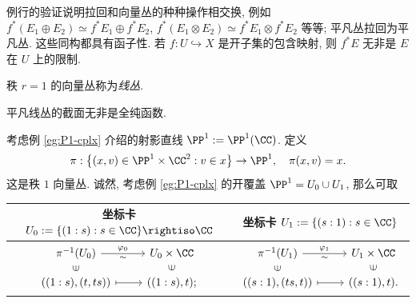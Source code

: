 例行的验证说明拉回和向量丛的种种操作相交换, 例如 $f^*(E_1 \oplus E_2) \simeq f^* E_1 \oplus f^* E_2$, $f^*(E_1 \otimes E_2) \simeq f^* E_1 \otimes f^* E_2$ 等等; 平凡丛拉回为平凡丛. 这些同构都具有函子性. 若 $f: U \hookrightarrow X$ 是开子集的包含映射, 则 $f^* E$ 无非是 $E$ 在 $U$ 上的限制.

\begin{definition}
	秩 $r=1$ 的向量丛称为\emph{线丛}.
\end{definition}

平凡线丛的截面无非是全纯函数.

\begin{example}[重言式线丛]\label{eg:tautological-bundle} 
	考虑例 \ref{eg:P1-cplx} 介绍的射影直线 $\PP^1 := \PP^1(\CC)$. 定义
	\[ \pi: \left\{ (x,v) \in \PP^1 \times \CC^2 : v \in x \right\} \to \PP^1, \quad \pi(x, v) = x. \]
	这是秩 $1$ 向量丛. 诚然, 考虑例 \ref{eg:P1-cplx} 的开覆盖 $\PP^1 = U_0 \cup U_1$, 那么可取
	\begin{center}\begin{tabular}{c|c}
			坐标卡 $U_0 := \{ (1:s) : s \in \CC \} \rightiso \CC$ & 坐标卡 $U_1 := \{(s:1) : s \in \CC \}$ \\ \hline
			$\begin{tikzcd}[row sep=small]
			\pi^{-1}(U_0) \arrow[r, "\sim"', "\varphi_0"] & U_0 \times \CC \\
			\left((1:s), (t,ts)\right) \arrow[r, mapsto] \arrow[phantom, u, "\in" sloped] & ((1:s), t); \arrow[phantom, u, "\in" sloped]
			\end{tikzcd}$ &
			$\begin{tikzcd}[row sep=small]
			\pi^{-1}(U_1) \arrow[r, "\sim"', "\varphi_1"] & U_1 \times \CC \\
			\left((s:1), (ts,t)\right) \arrow[r, mapsto] \arrow[phantom, u, "\in" sloped] & ((s:1), t). \arrow[phantom, u, "\in" sloped]
			\end{tikzcd}$
	\end{tabular}\end{center}
	

\end{example}
